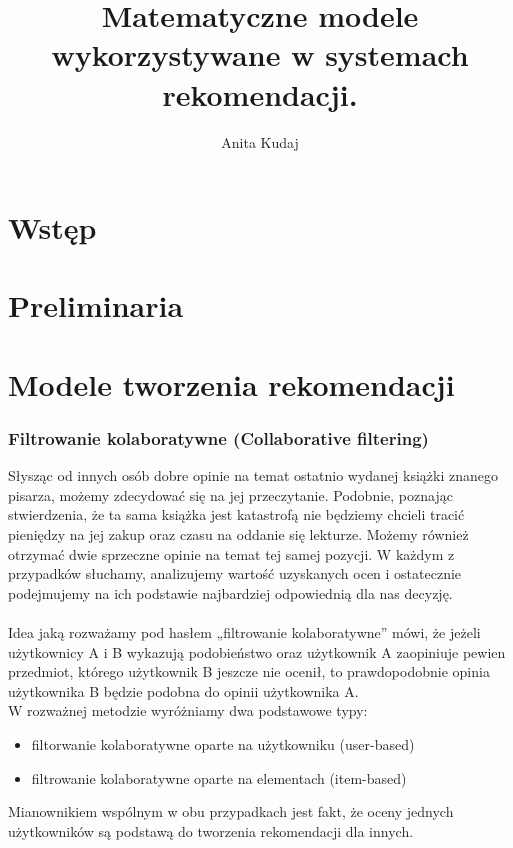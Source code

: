 \documentclass[12pt,a4paper]{report}
\author{Anita Kudaj}
\title{Matematyczne modele wykorzystywane w systemach rekomendacji.}
\begin{document}
\maketitle

\tableofcontents

\chapter{Wstęp}
\chapter{Preliminaria} %

\chapter{Modele tworzenia rekomendacji}
\subsection{Filtrowanie kolaboratywne (Collaborative filtering)}
Słysząc od innych osób dobre opinie na temat ostatnio wydanej książki znanego pisarza, możemy zdecydować się na jej przeczytanie. Podobnie, poznając stwierdzenia, że ta sama książka jest katastrofą nie będziemy chcieli tracić pieniędzy na jej zakup oraz czasu na oddanie się lekturze. Możemy również otrzymać dwie sprzeczne opinie na temat tej samej pozycji. W każdym z przypadków słuchamy, analizujemy wartość uzyskanych ocen i ostatecznie podejmujemy na ich podstawie najbardziej odpowiednią dla nas decyzję. 
\\
\\Idea jaką rozważamy pod hasłem „filtrowanie kolaboratywne”  mówi, że jeżeli użytkownicy A i B wykazują podobieństwo oraz użytkownik A zaopiniuje pewien przedmiot, którego użytkownik B jeszcze nie ocenił, to prawdopodobnie opinia użytkownika B będzie podobna do opinii użytkownika A.
\\W rozważnej metodzie wyróżniamy dwa podstawowe typy:
\begin{itemize}
\item filtorwanie kolaboratywne oparte na użytkowniku (user-based)
\item filtrowanie kolaboratywne oparte na  elementach (item-based)
\end{itemize}
Mianownikiem wspólnym w obu przypadkach jest fakt, że oceny jednych użytkowników są podstawą do tworzenia rekomendacji dla innych. 
\\
\end{document}
